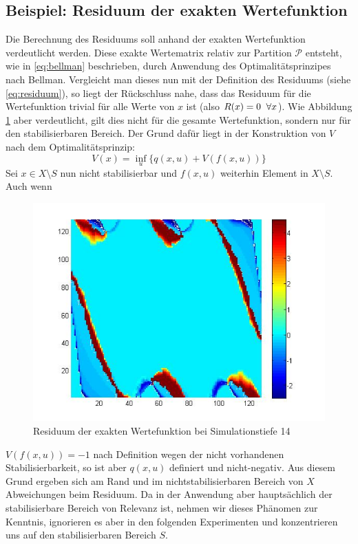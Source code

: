\documentclass[12pt,a4paper,twoside]{article}
\begin{document}
	\subsection{Beispiel: Residuum der exakten Wertefunktion}
	Die Berechnung des Residuums soll anhand der exakten Wertefunktion verdeutlicht werden. Diese exakte Wertematrix 
	relativ zur Partition $\mathcal{P}$ entsteht, wie in \ref{eq:bellman} beschrieben, durch Anwendung des 
	Optimalitätsprinzipes nach Bellman. Vergleicht man dieses nun mit der Definition des Residuums (siehe \ref{eq:residuum}), so liegt der Rückschluss nahe, dass das Residuum für die Wertefunktion trivial für alle Werte von $x$ ist (also $R(x)=0 \hspace{2mm}\forall x$). Wie Abbildung \ref{pic:res_exakt} aber verdeutlicht, gilt dies nicht 
	für die gesamte Wertefunktion, sondern nur für den stabilisierbaren Bereich. Der Grund dafür liegt in der 
	Konstruktion von $V$ nach dem Optimalitätsprinzip:
	\begin{equation*}
		V(x)=\inf_{u}\{q(x,u)+V(f(x,u))\}
	\end{equation*}
	Sei $x\in X\setminus S$ nun nicht stabilisierbar und $f(x,u)$ weiterhin Element in $X\setminus S$. Auch wenn 
	\begin{figure}[h]
	\center
		\includegraphics[scale=0.4]{Residuum_exactV_depth14.jpg}
		\caption{\label{pic:res_exakt}Residuum der exakten Wertefunktion bei Simulationstiefe 14}
	\end{figure}
	$V(f(x,u))=-1$ nach Definition wegen der nicht vorhandenen Stabilisierbarkeit, so ist aber $q(x,u)$ definiert und nicht-negativ. Aus diesem Grund ergeben sich 
	am Rand und im nichtstabilisierbaren Bereich von $X$ Abweichungen beim Residuum. Da in der Anwendung aber 
	hauptsächlich der stabilisierbare Bereich von Relevanz ist, nehmen wir dieses Phänomen zur Kenntnis, ignorieren 
	es aber in den folgenden Experimenten und konzentrieren uns auf den stabilisierbaren Bereich $S$.
	\newpage
\end{document}
